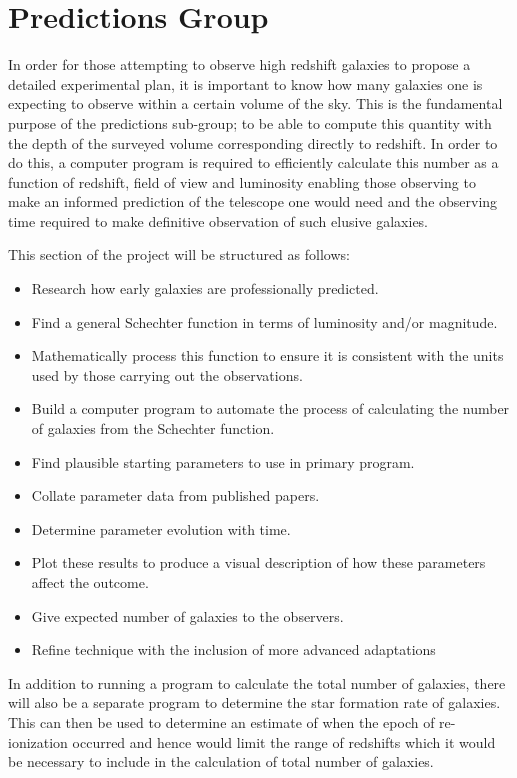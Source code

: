 
\section{Predictions Group} %
	\label{sec:predictions_group} 
	In order for those attempting to observe high redshift galaxies to propose a detailed experimental plan, it is important to know how many galaxies one is expecting to observe within a certain volume of the sky. This is the fundamental purpose of the predictions sub-group; to be able to compute this quantity with the depth of the surveyed volume corresponding directly to redshift. In order to do this, a computer program is required to efficiently calculate this number as a function of redshift, field of view and luminosity enabling those observing to make an informed prediction of the telescope one would need and the observing time required to make definitive observation of such elusive galaxies. 
	
	This section of the project will be structured as follows: 
	\begin{itemize}
		\item Research how early galaxies are professionally predicted. 
		\item Find a general Schechter function in terms of luminosity and/or magnitude. 
		\item Mathematically process this function to ensure it is consistent with the units used by those carrying out the observations. 
		\item Build a computer program to automate the process of calculating the number of galaxies from the Schechter function. 
		\item Find plausible starting parameters to use in primary program.
		\item Collate parameter data from published papers. 
		\item Determine parameter evolution with time. 
		\item Plot these results to produce a visual description of how these parameters affect the outcome. 
		\item Give expected number of galaxies to the observers. 
		\item Refine technique with the inclusion of more advanced adaptations
	\end{itemize}

	In addition to running a program to calculate the total number of galaxies, there will also be a separate program to determine the star formation rate of galaxies. This can then be used to determine an estimate of when the epoch of re-ionization occurred and hence would limit the range of redshifts which it would be necessary to include in the calculation of total number of galaxies. 


